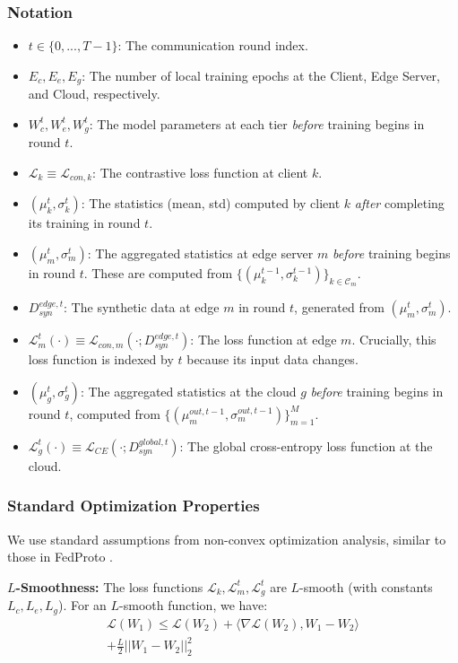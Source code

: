 \subsubsection*{Notation}
\begin{itemize}
    \item $t \in \{0, ..., T-1\}$: The communication round index.
    \item $E_c, E_e, E_g$: The number of local training epochs at the Client, Edge Server, and Cloud, respectively.
    \item $W_c^t, W_e^t, W_g^t$: The model parameters at each tier \textit{before} training begins in round $t$.
    \item $\mathcal{L}_k \equiv \mathcal{L}_{con,k}$: The contrastive loss function at client $k$.
    \item $(\mu_k^t, \sigma_k^t)$: The statistics (mean, std) computed by client $k$ \textit{after} completing its training in round $t$.
    \item $(\mu_m^t, \sigma_m^t)$: The aggregated statistics at edge server $m$ \textit{before} training begins in round $t$. These are computed from $\{(\mu_k^{t-1}, \sigma_k^{t-1})\}_{k \in \mathcal{C}_m}$.
    \item $D_{syn}^{edge, t}$: The synthetic data at edge $m$ in round $t$, generated from $(\mu_m^t, \sigma_m^t)$.
    \item $\mathcal{L}_m^t(\cdot) \equiv \mathcal{L}_{con,m}(\cdot; D_{syn}^{edge, t})$: The loss function at edge $m$. Crucially, this loss function is indexed by $t$ because its input data changes.
    \item $(\mu_g^t, \sigma_g^t)$: The aggregated statistics at the cloud $g$ \textit{before} training begins in round $t$, computed from $\{(\mu_m^{out, t-1}, \sigma_m^{out, t-1})\}_{m=1}^M$.
    \item $\mathcal{L}_g^t(\cdot) \equiv \mathcal{L}_{CE}(\cdot; D_{syn}^{global, t})$: The global cross-entropy loss function at the cloud.
\end{itemize}

\subsubsection*{Standard Optimization Properties}
We use standard assumptions from non-convex optimization analysis, similar to those in FedProto \cite{tan2022fedproto}.

\noindent\textbf{$L$-Smoothness:}
The loss functions $\mathcal{L}_k, \mathcal{L}_m^t, \mathcal{L}_g^t$ are $L$-smooth (with constants $L_c, L_e, L_g$). For an $L$-smooth function, we have:
\begin{multline}
    \mathcal{L}(W_1) \le \mathcal{L}(W_2) + \langle \nabla \mathcal{L}(W_2), W_1 - W_2 \rangle \\
    + \frac{L}{2} ||W_1 - W_2||_2^2
    \label{ass:smoothness}
\end{multline}

